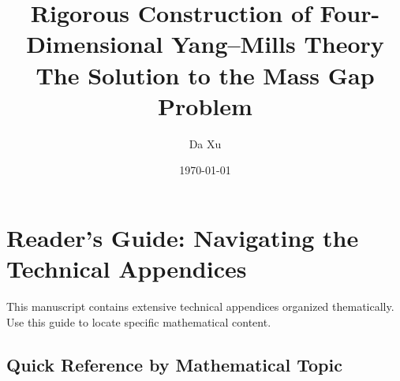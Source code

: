 \documentclass[11pt,a4paper]{report}
\title{\textbf{Rigorous Construction of Four-Dimensional Yang--Mills Theory}\\ \large The Solution to the Mass Gap Problem}
\author{Da Xu}
\date{\today}
\begin{document}
\maketitle



\tableofcontents




\newpage

\chapter*{Reader's Guide: Navigating the Technical Appendices}

This manuscript contains extensive technical appendices organized thematically. Use this guide to locate specific mathematical content.

\section*{Quick Reference by Mathematical Topic}
\end{document}
